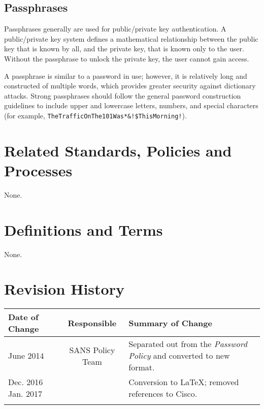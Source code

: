 \subsection{Passphrases}
Passphrases generally are used for public/private key authentication.  
A public/private key system defines a mathematical relationship between the public key that is known by all, and the private key, that is known only to the user.  
Without the passphrase to unlock the private key, the user cannot gain access.

A passphrase is similar to a password in use; however, it is relatively long and constructed of multiple words, which provides greater security against dictionary attacks.  
Strong passphrases should follow the general password construction guidelines to include upper and lowercase letters, numbers, and special characters (for example, \texttt{TheTrafficOnThe101Was*\&!\$ThisMorning!}).

\CommonPolicyCompliance
\section{Related Standards, Policies\oxford{} and Processes}
None.
\section{Definitions and Terms}
None.
\section{Revision History}
\begin{tabular}{|p{1in}|c|p{3in}|}
\hline
	Date of Change&
	Responsible&
	Summary of Change\\
\hline
	June 2014&
	SANS Policy Team&
	Separated out from the \textsl{Password Policy} and converted to new format.\\
\hline
	Dec. 2016\newline{}	Jan. 2017&
	\xio{}&
	Conversion to \LaTeX{}; removed references to Cisco.\\
\hline
	 &
	 &
	 \\
\hline
\end{tabular}
